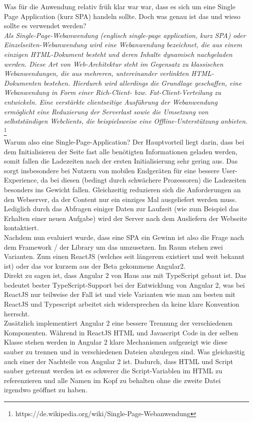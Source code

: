 Was für die Anwendung relativ früh klar war war, dass es sich um eine Single Page Application (kurz SPA) handeln sollte. Doch was genau ist das und wieso sollte es verwendet werden? \\


\emph{\glqq   
Als Single-Page-Webanwendung (englisch single-page application, kurz SPA) oder Einzelseiten-Webanwendung wird eine Webanwendung bezeichnet, die aus einem einzigen HTML-Dokument besteht und deren Inhalte dynamisch nachgeladen werden. Diese Art von Web-Architektur steht im Gegensatz zu klassischen Webanwendungen, die aus mehreren, untereinander verlinkten HTML-Dokumenten bestehen. Hierdurch wird allerdings die Grundlage geschaffen, eine Webanwendung in Form einer Rich-Client- bzw. Fat-Client-Verteilung zu entwickeln. Eine verstärkte clientseitige Ausführung der Webanwendung ermöglicht eine Reduzierung der Serverlast sowie die Umsetzung von selbstständigen Webclients, die beispielsweise eine Offline-Unterstützung anbieten.
\grqq} \footnote{https://de.wikipedia.org/wiki/Single-Page-Webanwendung} \\

Warum also eine Single-Page-Application? Der Hauptvorteil liegt darin, dass bei dem Initialisieren der Seite fast alle benötigten Informationen geladen werden, somit fallen die Ladezeiten nach der ersten Initialisierung sehr gering aus. Das sorgt insbesondere bei Nutzern von mobilen Endgeräten für eine bessere User-Experience, da bei diesen (bedingt durch schwächere Prozessoren) die Ladezeiten besonders ins Gewicht fallen. Gleichzeitig reduzieren sich die Anforderungen an den Webserver, da der Content nur ein einziges Mal ausgeliefert werden muss. Lediglich durch das Abfragen einiger Daten zur Laufzeit (wie zum Beispiel das Erhalten einer neuen Aufgabe) wird der Server nach dem Ausliefern der Webseite kontaktiert.\\

Nachdem nun evaluiert wurde, dass eine SPA ein Gewinn ist also die Frage nach dem Framework / der Library um das umzusetzen. Im Raum stehen zwei Varianten. Zum einen ReactJS (welches seit längerem existiert und weit bekannt ist) oder das vor kurzem aus der Beta gekommene Angular2. \\
Direkt zu sagen ist, dass Angular 2 von Haus aus mit TypeScript gebaut ist. Das bedeutet bester TypeScript-Support bei der Entwicklung von Angular 2, was bei ReactJS nur teilweise der Fall ist und viele Varianten wie man am besten mit ReactJS und Typescript arbeitet sich widersprechen da keine klare Konvention herrscht. \\
Zusätzlich implementiert Angular 2 eine bessere Trennung der verschiedenen Komponenten. Während in ReactJS HTML und Javascript Code in der selben Klasse stehen werden in Angular 2 klare Mechanismen aufgezeigt wie diese sauber zu trennen und in verschiedenen Dateien abzulegen sind. Was gleichzeitig auch einer der Nachteile von Angular 2 ist. Dadurch, dass HTML und Script sauber getrennt werden ist es schwerer die Script-Variablen im HTML zu referenzieren und alle Namen im Kopf zu behalten ohne die zweite Datei irgendwo geöffnet zu haben. \\

